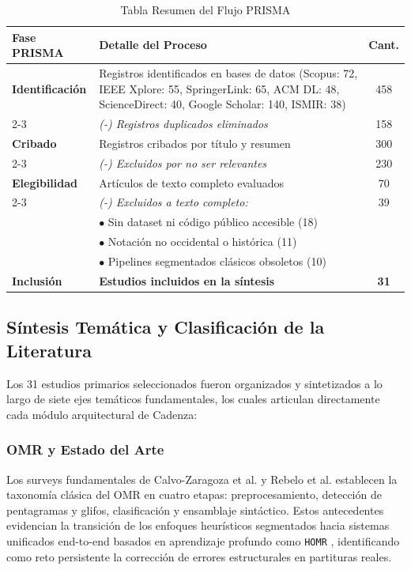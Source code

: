 \begin{table}[htbp]
\caption{Tabla Resumen del Flujo PRISMA}
\label{tab:resumen-prisma}
\centering
\footnotesize
\begin{tabular}{|l|p{4.8cm}|c|}
\hline
\textbf{Fase PRISMA} & \textbf{Detalle del Proceso} & \textbf{Cant.} \\
\hline
\textbf{Identificaci\'on} & Registros identificados en bases de datos (Scopus: 72, IEEE Xplore: 55, SpringerLink: 65, ACM DL: 48, ScienceDirect: 40, Google Scholar: 140, ISMIR: 38) & 458 \\
\cline{2-3}
& \emph{(-) Registros duplicados eliminados} & 158 \\
\hline
\textbf{Cribado} & Registros cribados por t\'itulo y resumen & 300 \\
\cline{2-3}
& \emph{(-) Excluidos por no ser relevantes} & 230 \\
\hline
\textbf{Elegibilidad} & Art\'iculos de texto completo evaluados & 70 \\
\cline{2-3}
& \emph{(-) Excluidos a texto completo:} & 39 \\
& \quad $\bullet$ Sin dataset ni c\'odigo p\'ublico accesible (18) & \\
& \quad $\bullet$ Notaci\'on no occidental o hist\'orica (11) & \\
& \quad $\bullet$ Pipelines segmentados cl\'asicos obsoletos (10) & \\
\hline
\textbf{Inclusi\'on} & \textbf{Estudios incluidos en la s\'intesis} & \textbf{31} \\
\hline
\end{tabular}
\end{table}

\subsection{S\'intesis Tem\'atica y Clasificaci\'on de la Literatura}
\label{sec:sintesis-literatura}

Los 31 estudios primarios seleccionados fueron organizados y sintetizados a lo largo de siete ejes tem\'aticos fundamentales, los cuales articulan directamente cada m\'odulo arquitectural de Cadenza:

\subsubsection{OMR y Estado del Arte}
Los surveys fundamentales de Calvo-Zaragoza et al. \cite{omr2020} y Rebelo et al. \cite{rebelo2012} establecen la taxonom\'ia cl\'asica del OMR en cuatro etapas: preprocesamiento, detecci\'on de pentagramas y glifos, clasificaci\'on y ensamblaje sint\'actico. Estos antecedentes evidencian la transici\'on de los enfoques heur\'isticos segmentados hacia sistemas unificados end-to-end basados en aprendizaje profundo como \texttt{HOMR} \cite{homr2024}, identificando como reto persistente la correcci\'on de errores estructurales en partituras reales.

